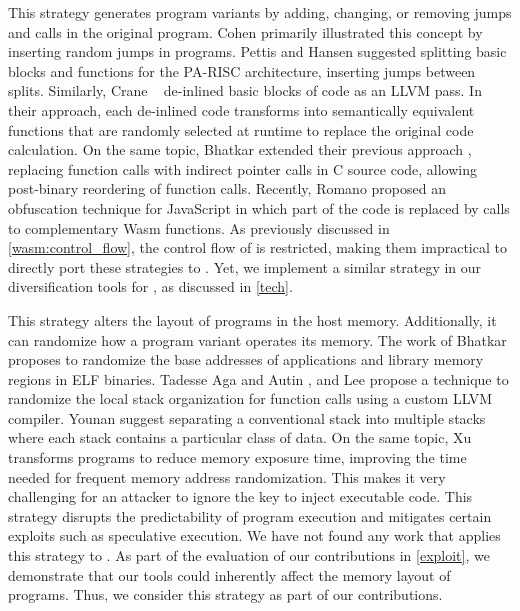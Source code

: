 This strategy generates program variants by adding, changing, or removing jumps and calls in the original program. Cohen \cite{cohen1993operating} primarily illustrated this concept by inserting random jumps in programs. Pettis and Hansen \cite{pettisochhansen} suggested splitting basic blocks and functions for the PA-RISC architecture, inserting jumps between splits.
Similarly, Crane \etal~\cite{crane2015thwarting} de-inlined basic blocks of code as an LLVM pass. 
In their approach, each de-inlined code transforms into semantically equivalent functions that are randomly selected at runtime to replace the original code calculation. 
On the same topic, Bhatkar \etal \cite{bhatkar2005efficient} extended their previous approach \cite{bhatkar03}, replacing function calls with indirect pointer calls in C source code, allowing post-binary reordering of function calls. 
Recently, Romano \etal \cite{wobfuscator} proposed an obfuscation technique for JavaScript in which part of the code is replaced by calls to complementary Wasm functions.
As previously discussed in \autoref{wasm:control_flow}, the control flow of \Wasm is restricted, making them impractical to directly port these strategies to \Wasm.
Yet, we implement a similar strategy in our diversification tools for \Wasm, as discussed in \autoref{tech}.

This strategy alters the layout of programs in the host memory. 
Additionally, it can randomize how a program variant operates its memory. 
The work of Bhatkar \etal \cite{bhatkar03, bhatkar2005efficient} proposes to randomize the base addresses of applications and library memory regions in ELF binaries. 
Tadesse Aga and Autin \cite{aga2019smokestack}, and Lee \etal \cite{lee2021savior} propose a technique to randomize the local stack organization for function calls using a custom LLVM compiler.
Younan \etal \cite{Younan2006} suggest separating a conventional stack into multiple stacks where each stack contains a particular class of data. 
On the same topic, Xu \etal \cite{xu2020merr} transforms programs to reduce memory exposure time, improving the time needed for frequent memory address randomization. 
This makes it very challenging for an attacker to ignore the key to inject executable code. 
This strategy disrupts the predictability of program execution and mitigates certain exploits such as speculative execution. 
We have not found any work that applies this strategy to \Wasm.
As part of the evaluation of our contributions in \autoref{exploit}, we demonstrate that our tools could inherently affect the memory layout of \Wasm programs.
Thus, we consider this strategy as part of our contributions.

